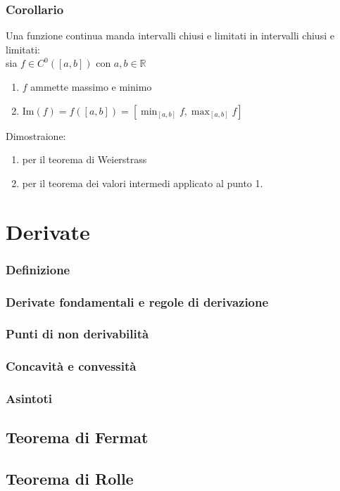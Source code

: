 \documentclass[a4paper]{article}
\newcommand\cont[2]{C^{#1} ({#2})}
\begin{document}
\subsubsection*{Corollario}
Una funzione continua manda intervalli chiusi e limitati in intervalli chiusi e limitati: \\
sia \(f \in \cont{0}{\left[a, b\right]}\) con \(a, b \in \mathbb{R}\)
\begin{enumerate}
	\item \(f\) ammette massimo e minimo
	\item \(\displaystyle \text{Im}(f) = f(\left[a, b\right]) = \left[\min_{\left[a, b\right]} f, \max_{\left[a, b\right]} f\right]\)
\end{enumerate}
Dimostraione:
\begin{enumerate}
	\item per il teorema di Weierstrass
	\item per il teorema dei valori intermedi applicato al punto 1.
\end{enumerate}

\newpage


\section{Derivate}
\subsubsection*{Definizione}
\subsubsection*{Derivate fondamentali e regole di derivazione}
\subsubsection*{Punti di non derivabilità}
\subsubsection*{Concavità e convessità}
\subsubsection*{Asintoti}

\subsection{Teorema di Fermat}
\subsection{Teorema di Rolle}
\end{document}
